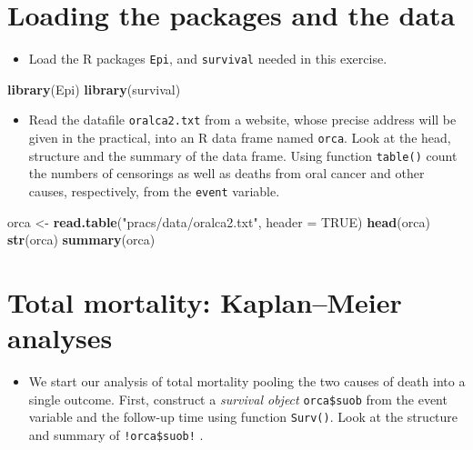 \documentclass[
]{book}
\newenvironment{Shaded}{\begin{snugshade}}{\end{snugshade}}
\newcommand{\AttributeTok}[1]{\textcolor[rgb]{0.13,0.29,0.53}{#1}}
\newcommand{\ConstantTok}[1]{\textcolor[rgb]{0.56,0.35,0.01}{#1}}
\newcommand{\FunctionTok}[1]{\textcolor[rgb]{0.13,0.29,0.53}{\textbf{#1}}}
\newcommand{\NormalTok}[1]{#1}
\newcommand{\OtherTok}[1]{\textcolor[rgb]{0.56,0.35,0.01}{#1}}
\newcommand{\StringTok}[1]{\textcolor[rgb]{0.31,0.60,0.02}{#1}}
\providecommand{\tightlist}{%
  \setlength{\itemsep}{0pt}\setlength{\parskip}{0pt}}
\begin{document}
\section{Loading the packages and the data}\label{loading-the-packages-and-the-data}

\begin{itemize}
\tightlist
\item
  Load the R packages \texttt{Epi}, and \texttt{survival} needed in this exercise.
\end{itemize}

\begin{Shaded}
\begin{Highlighting}[]
\FunctionTok{library}\NormalTok{(Epi)}
\FunctionTok{library}\NormalTok{(survival)}
\end{Highlighting}
\end{Shaded}

\begin{itemize}
\tightlist
\item
  Read the datafile \texttt{oralca2.txt} from
  a website, whose precise address will be given in the practical,
  into an R data frame named \texttt{orca}.
  Look at the head, structure and the summary of the data frame.
  Using function \texttt{table()} count the numbers of censorings
  as well as deaths from oral cancer and other causes, respectively,
  from the \texttt{event} variable.
\end{itemize}

\begin{Shaded}
\begin{Highlighting}[]
\NormalTok{orca }\OtherTok{\textless{}{-}} \FunctionTok{read.table}\NormalTok{(}\StringTok{"pracs/data/oralca2.txt"}\NormalTok{, }\AttributeTok{header =} \ConstantTok{TRUE}\NormalTok{)}
\FunctionTok{head}\NormalTok{(orca)}
\FunctionTok{str}\NormalTok{(orca)}
\FunctionTok{summary}\NormalTok{(orca)}
\end{Highlighting}
\end{Shaded}

\section{Total mortality: Kaplan--Meier analyses}\label{total-mortality-kaplanmeier-analyses}

\begin{itemize}
\tightlist
\item
  We start our analysis of total mortality pooling the two causes of death into
  a single outcome.
  First, construct a \emph{survival object} \texttt{orca\$suob} from
  the event variable and the follow-up time using function \texttt{Surv()}.
  Look at the structure and summary of \texttt{!orca\$suob!} .
\end{itemize}
\end{document}
